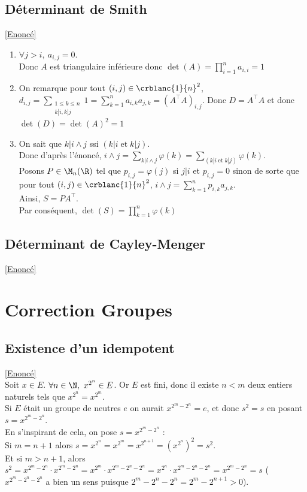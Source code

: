 \documentclass[8pt]{book}
\begin{document}
	\subsection{Déterminant de Smith }
	\label{Déterminant de Smith corrigé}
	\textcolor{blue}{\hyperref[Déterminant de Smith]{[Enoncé]}}\\
	\begin{enumerate}
		\item $\forall j>i,\ a_{i,j}=0$.
		\\Donc $A$ est triangulaire inférieure donc $\det(A)=\displaystyle\prod_{i=1}^na_{i,i}=1$
		\item On remarque pour tout $(i,j)\in\crblanc{1}{n}^2$, $d_{i,j}=\displaystyle\sum_{\substack{1\leq k\leq n\\k|i,k|j}}1=\sum_{k=1}^na_{i,k}a_{j,k}=(A^\top A)_{i,j}$.
		Donc $D=A^\top A$ et donc $\det(D)=\det(A)^2=1$
		\item On sait que $k|i\wedge j$ ssi $(k|i \;\text{et}\; k|j)$.
		\\Donc d'après l'énoncé, $i\wedge j=\displaystyle\sum_{k|i\wedge j}\varphi(k)=\sum_{(k|i \;\text{et}\; k|j)}\varphi(k)$.
		\\Posons $P\in\M_n(\R)$ tel que $p_{i,j}=\varphi(j)$ si $j|i$ et $p_{i,j}=0$ sinon de sorte que pour tout $(i,j)\in\crblanc{1}{n}^2$, $i\wedge j=\displaystyle\sum_{k=1}^np_{i,k}a_{j,k}$.
		\\Ainsi, $S=PA^\top$.
		\\Par conséquent, $\det(S)=\displaystyle\prod_{k=1}^n\varphi(k)$
	\end{enumerate}
	
	\subsection{Déterminant de Cayley-Menger}
	\label{Déterminant de Cayley-Menger corrigé}
	\textcolor{blue}{\hyperref[Déterminant de Cayley-Menger]{[Enoncé]}}\\
	\newpage
\section{Correction Groupes}
	\subsection{Existence d'un idempotent }
	\label{Existence d'un idempotent corrigé}
	\textcolor{blue}{\hyperref[Existence d'un idempotent]{[Enoncé]}}\\
	Soit $x\in E$. $\forall n\in \N,\ x^{2^n}\in E$. Or $E$ est fini, donc il existe $n<m$ deux entiers naturels tels que $x^{2^n}=x^{2^m}$.\\
	Si $E$ était un groupe de neutres $e$ on aurait $x^{2^m-2^n}=e$, et donc $s^2=s$ en posant $s=x^{2^m-2^n}$.\\
	En s'inspirant de cela, on pose $s=x^{2^m-2^n}$ :\\
	Si $m=n+1$ alors $s=x^{2^n}=x^{2^m}=x^{2^{n+1}}=\left(x^{2^n}\right)^2=s^2$.\\
	Et si $m>n+1$, alors $s^2=x^{2^m-2^n}\cdot x^{2^m-2^n}=x^{2^m}\cdot x^{2^m-2^n-2^n}=x^{2^n}\cdot x^{2^m-2^n-2^n}=x^{2^m-2^n}=s$ ($x^{2^m-2^n-2^n}$ a bien un sens puisque $2^m-2^n-2^n=2^m-2^{n+1}>0$).
	
\end{document}

